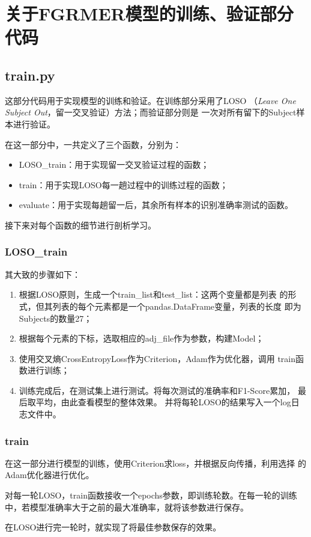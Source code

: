 \documentclass[AutoFakeBold]{MyFormat}
\begin{document}
\chapter{关于FGRMER模型的训练、验证部分代码}
\section{train.py}
\par 这部分代码用于实现模型的训练和验证。在训练部分采用了LOSO
（\textit{Leave One Subject Out}，留一交叉验证）方法；而验证部分则是
一次对所有留下的Subject样本进行验证。

\par 在这一部分中，一共定义了三个函数，分别为：
\begin{itemize}
    \item LOSO\_train：用于实现留一交叉验证过程的函数；
    \item train：用于实现LOSO每一趟过程中的训练过程的函数；
    \item evaluate：用于实现每趟留一后，其余所有样本的识别准确率测试的函数。
\end{itemize}
\par 接下来对每个函数的细节进行剖析学习。


\subsection{LOSO\_train}
\par 其大致的步骤如下：
\begin{enumerate}
    \item 根据LOSO原则，生成一个train\_list和test\_list：这两个变量都是列表
    的形式，但其列表的每个元素都是一个pandas.DataFrame变量，列表的长度
    即为Subjects的数量27；
    \item 根据每个元素的下标，选取相应的adj\_file作为参数，构建Model；
    \item 使用交叉熵CrossEntropyLoss作为Criterion，Adam作为优化器，调用
    train函数进行训练；
    \item 训练完成后，在测试集上进行测试。将每次测试的准确率和F1-Score累加，
    最后取平均，由此查看模型的整体效果。
    并将每轮LOSO的结果写入一个log日志文件中。
\end{enumerate}


\subsection{train}
\par 在这一部分进行模型的训练，使用Criterion求loss，并根据反向传播，利用选择
的Adam优化器进行优化。
\par 对每一轮LOSO，train函数接收一个epochs参数，即训练轮数。在每一轮的训练
中，若模型准确率大于之前的最大准确率，就将该参数进行保存。
\par 在LOSO进行完一轮时，就实现了将最佳参数保存的效果。
\end{document}
